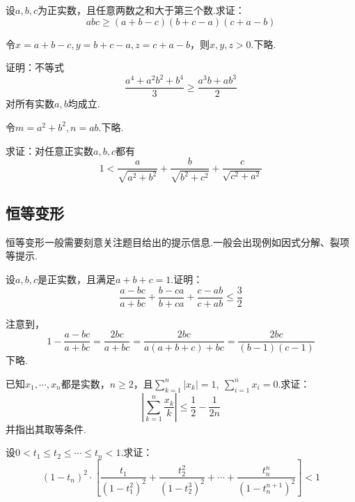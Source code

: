 \documentclass[cn,hazy,black,10pt,normal]{elegantnote}
\begin{document}
\begin{problem} %
	设$a,b,c$为正实数，且任意两数之和大于第三个数.求证：$$abc \geq (a+b-c)(b+c-a)(c+a-b)$$
\end{problem}
\begin{solution}
	令$x=a+b-c,y=b+c-a,z=c+a-b$，则$x,y,z>0$.下略.
\end{solution}

\begin{problem} %
	证明：不等式$$\frac{a^4+a^2b^2+b^4}{3} \geq \frac{a^3b+ab^3}{2}$$
	对所有实数$a,b$均成立.
\end{problem}
\begin{solution}
	令$m=a^2+b^2,n=ab$.下略.
\end{solution}

\begin{problem} %
	求证：对任意正实数$a,b,c$都有$$1 < \frac{a}{\sqrt{a^2+b^2}} + \frac{b}{\sqrt{b^2+c^2}} + \frac{c}{\sqrt{c^2+a^2}}$$
\end{problem}
\begin{solution}
\end{solution}

\subsection{恒等变形}

恒等变形一般需要刻意关注题目给出的提示信息.一般会出现例如因式分解、裂项等提示.

\begin{problem} %
	设$a,b,c$是正实数，且满足$a+b+c=1$.证明：$$\frac{a-bc}{a+bc} + \frac{b-ca}{b+ca} + \frac{c-ab}{c+ab} \leq \frac{3}{2}$$
\end{problem}
\begin{solution}
	注意到，$$1-\frac{a-bc}{a+bc} = \frac{2bc}{a+bc} = \frac{2bc}{a(a+b+c)+bc} = \frac{2bc}{(b-1)(c-1)}$$
	下略.
\end{solution}

\begin{problem} %
	已知$x_1, \cdots ,x_n$都是实数，$n \geq 2$，且$\sum_{k=1}^{n} |x_k|=1,~\sum_{i=1}^{n} x_i = 0$.求证：$$\left| \sum_{k=1}^{n} \frac{x_k}{k} \right| \leq \frac{1}{2}-\frac{1}{2n} $$
	并指出其取等条件.
\end{problem}
\begin{solution}
\end{solution}

\begin{problem} %
	设$0<t_1 \leq t_2 \leq \cdots \leq t_n <1$.求证：$$(1-t_n)^2 \cdot \left[ \frac{t_1}{(1-t_1^2)^2} + \frac{t_2^2}{(1-t_2^3)^2} + \cdots + \frac{t_n^n}{(1-t_n^{n+1})^2} \right] < 1$$
\end{problem}
\begin{solution}
\end{solution}
\end{document}
